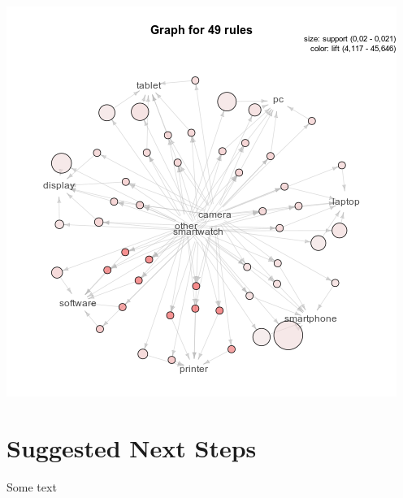 \documentclass[12pt,a4paper,leqno]{report}
\theoremstyle{plain}
\theoremstyle{definition}
\theoremstyle{remark}
\begin{document}
\bigskip
{
    \centering
    \includegraphics[width=\textwidth,height=\textheight,keepaspectratio]{apriori_product_category_level_graph.png}
    \par
}
\bigskip

\section{Suggested Next Steps}

Some text
\end{document}
